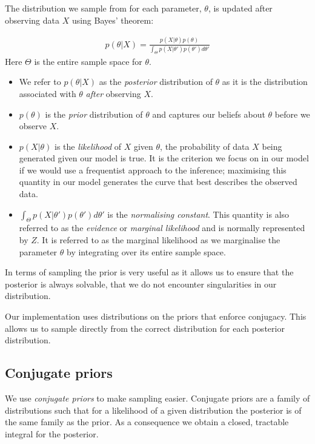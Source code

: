 \documentclass[11pt]{article} %
\begin{document}
The distribution we sample from for each parameter, $\theta$, is updated after observing data $X$ using Bayes' theorem:

\begin{align} \label{Bayes_theorem}
p(\theta | X) = \frac{p(X | \theta) p(\theta)}{\int_\Theta p(X | \theta ') p(\theta ') d \theta '}
\end{align}
Here $\Theta$ is the entire sample space for $\theta$. 
\begin{itemize}
 \item We refer to $p(\theta | X)$ as the \emph{posterior} distribution of $\theta$ as it is the distribution associated with $\theta$ \emph{after} observing $X$.
 \item $p(\theta)$ is the \emph{prior} distribution of $\theta$ and captures our beliefs about $\theta$ before we observe $X$.
 \item $p(X | \theta)$ is the \emph{likelihood} of $X$ given $\theta$, the probability of data $X$ being generated given our model is true. It is the criterion we focus on in our model if we would use a frequentist approach to the inference; maximising this quantity in our model generates the curve that best describes the observed data. 
 \item $\int_\Theta p(X | \theta ') p(\theta ') d \theta '$ is the \emph{normalising constant}. This quantity is also referred to as the \emph{evidence} \cite{MacKayInformationTheoryInference2003} or \emph{marginal likelihood} and is normally represented by $Z$. It is referred to as the marginal likelihood as we marginalise the parameter $\theta$ by integrating over its entire sample space.
\end{itemize}

In terms of sampling the prior is very useful as it allows us to ensure that the posterior is always solvable, that we do not encounter singularities in our distribution.

Our implementation uses distributions on the priors that enforce conjugacy. This allows us to sample directly from the correct distribution for each posterior distribution.

\subsection{Conjugate priors}
We use \emph{conjugate priors} to make sampling easier. Conjugate priors are a family of distributions such that for a likelihood of a given distribution the posterior is of the same family as the prior. As a consequence we obtain a closed, tractable integral for the posterior.
\end{document}

